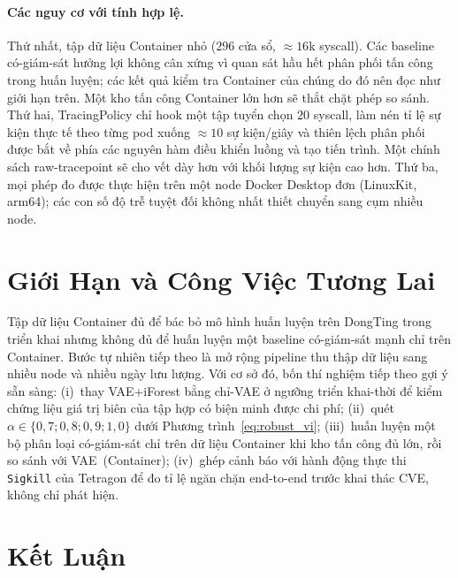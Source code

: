 \paragraph{Các nguy cơ với tính hợp lệ.}
Thứ nhất, tập dữ liệu Container nhỏ ($296$ cửa sổ, $\approx\!16$k
syscall). Các baseline có-giám-sát hưởng lợi không cân xứng vì quan
sát hầu hết phân phối tấn công trong huấn luyện; các kết quả kiểm tra
Container của chúng do đó nên đọc như giới hạn trên. Một kho tấn công
Container lớn hơn sẽ thắt chặt phép so sánh. Thứ hai, TracingPolicy
chỉ hook một tập tuyển chọn $20$ syscall, làm nén tỉ lệ sự kiện thực
tế theo từng pod xuống $\approx\!10$ sự kiện/giây và thiên lệch phân
phối được bắt về phía các nguyên hàm điều khiển luồng và tạo tiến
trình. Một chính sách raw-tracepoint sẽ cho vết dày hơn với khối
lượng sự kiện cao hơn. Thứ ba, mọi phép đo được thực hiện trên một
node Docker Desktop đơn (LinuxKit, arm64); các con số độ trễ tuyệt
đối không nhất thiết chuyển sang cụm nhiều node.

\FloatBarrier
\section{Giới Hạn và Công Việc Tương Lai}
\label{sec:future_vi}

Tập dữ liệu Container đủ để bác bỏ mô hình huấn luyện trên DongTing
trong triển khai nhưng không đủ để huấn luyện một baseline có-giám-sát
mạnh chỉ trên Container. Bước tự nhiên tiếp theo là mở rộng pipeline
thu thập dữ liệu sang nhiều node và nhiều ngày lưu lượng. Với cơ sở
đó, bốn thí nghiệm tiếp theo gợi ý sẵn sàng: (i)~thay VAE+iForest
bằng chỉ-VAE ở ngưỡng triển khai-thời để kiểm chứng liệu giá trị
biên của tập hợp có biện minh được chi phí; (ii)~quét
$\alpha\in\{0{,}7; 0{,}8; 0{,}9; 1{,}0\}$ dưới
Phương trình~\ref{eq:robust_vi}; (iii)~huấn luyện một bộ phân loại
có-giám-sát chỉ trên dữ liệu Container khi kho tấn công đủ lớn, rồi
so sánh với VAE~(Container); (iv)~ghép cảnh báo với hành động thực
thi \texttt{Sigkill} của Tetragon để đo tỉ lệ ngăn chặn end-to-end
trước khai thác CVE, không chỉ phát hiện.

\FloatBarrier
\section{Kết Luận}
\label{sec:conclusion_vi}

